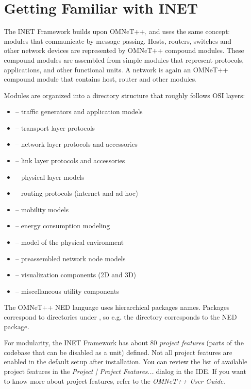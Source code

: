 \section{Getting Familiar with INET}
\label{sec:usage:getting-familiar-with-inet}

The INET Framework builds upon OMNeT++, and uses the same concept: modules
that communicate by message passing. Hosts, routers, switches and other
network devices are represented by OMNeT++ compound modules. These compound
modules are assembled from simple modules that represent protocols,
applications, and other functional units. A network is again an OMNeT++
compound module that contains host, router and other modules.

Modules are organized into a directory structure that roughly follows
OSI layers:

\begin{itemize}
  \item {} -- traffic generators and application models
  \item {} -- transport layer protocols
  \item {} -- network layer protocols and accessories
  \item {} -- link layer protocols and accessories
  \item {} -- physical layer models
  \item {} -- routing protocols (internet and ad hoc)
  \item {} -- mobility models
  \item {} -- energy consumption modeling
  \item {} -- model of the physical environment
  \item {} -- preassembled network node models
  \item {} -- visualization components (2D and 3D)
  \item {} -- miscellaneous utility components
\end{itemize}

The OMNeT++ NED language uses hierarchical packages names. Packages correspond
to directories under , so e.g. the 
directory corresponds to the  NED package.

For modularity, the INET Framework has about 80 \textit{project features}
(parts of the codebase that can be disabled as a unit) defined. Not all project
features are enabled in the default setup after installation. You can review
the list of available project features in the \textit{Project | Project Features...}
dialog in the IDE. If you want to know more about project features, refer to the
\textit{OMNeT++ User Guide}.



